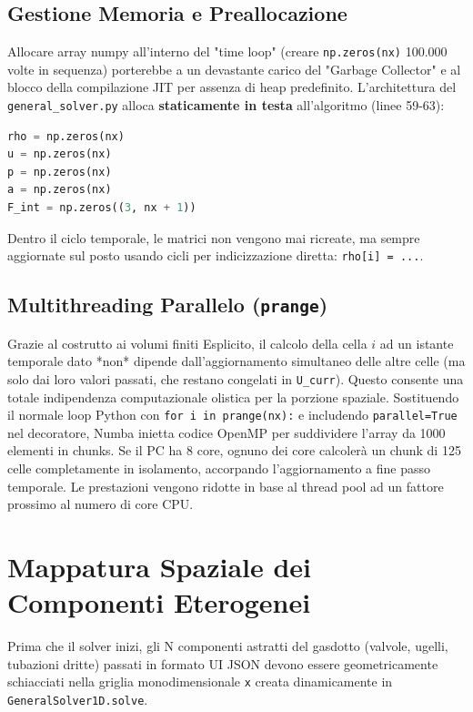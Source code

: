 \documentclass[11pt,a4paper]{article}
\begin{document}
\subsection{Gestione Memoria e Preallocazione}
Allocare array numpy all'interno del "time loop" (creare \texttt{np.zeros(nx)} 100.000 volte in sequenza) porterebbe a un devastante carico del "Garbage Collector" e al blocco della compilazione JIT per assenza di heap predefinito. 
L'architettura del \texttt{general\_solver.py} alloca \textbf{staticamente in testa} all'algoritmo (linee 59-63):
\begin{lstlisting}[language=Python]
rho = np.zeros(nx)
u = np.zeros(nx)
p = np.zeros(nx)
a = np.zeros(nx)
F_int = np.zeros((3, nx + 1))
\end{lstlisting}
Dentro il ciclo temporale, le matrici non vengono mai ricreate, ma sempre aggiornate sul posto usando cicli per indicizzazione diretta: \texttt{rho[i] = ...}. 

\subsection{Multithreading Parallelo (\texttt{prange})}
Grazie al costrutto ai volumi finiti Esplicito, il calcolo della cella $i$ ad un istante temporale dato *non* dipende dall'aggiornamento simultaneo delle altre celle (ma solo dai loro valori passati, che restano congelati in \texttt{U\_curr}). Questo consente una totale indipendenza computazionale olistica per la porzione spaziale.
Sostituendo il normale loop Python con \texttt{for i in prange(nx):} e includendo \texttt{parallel=True} nel decoratore, Numba inietta codice OpenMP per suddividere l'array da 1000 elementi in chunks. Se il PC ha 8 core, ognuno dei core calcolerà un chunk di 125 celle completamente in isolamento, accorpando l'aggiornamento a fine passo temporale. Le prestazioni vengono ridotte in base al thread pool ad un fattore prossimo al numero di core CPU.

\section{Mappatura Spaziale dei Componenti Eterogenei}

Prima che il solver inizi, gli N componenti astratti del gasdotto (valvole, ugelli, tubazioni dritte) passati in formato UI JSON devono essere geometricamente schiacciati nella griglia monodimensionale \texttt{x} creata dinamicamente in \texttt{GeneralSolver1D.solve}.
\end{document}
